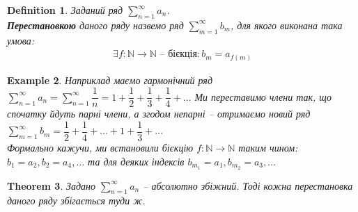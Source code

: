 \documentclass[a4paper, 10pt]{article}
\theoremstyle{theoremdd}
\newtheorem{theorem}{Theorem}[subsection]
\theoremstyle{theoremdd}
\theoremstyle{theoremdd}
\newtheorem{definition}[theorem]{Definition}
\theoremstyle{theoremdd}
\theoremstyle{theoremdd}
\newtheorem{example}[theorem]{Example}
\theoremstyle{theoremdd}
\theoremstyle{theoremdd}
\theoremstyle{theoremdd}
\theoremstyle{theoremdd}
\begin{document}
\begin{definition}
Заданий ряд $\displaystyle\sum_{n=1}^\infty a_n$.\\
\textbf{Перестановкою} даного ряду назвемо ряд $\displaystyle\sum_{m=1}^\infty b_m$, для якого виконана така умова:
\begin{align*}
\exists f \colon \mathbb{N} \to \mathbb{N} \text{ -- бієкція}: b_m = a_{f(m)}
\end{align*}
\end{definition}

\begin{example}
Наприклад маємо гармонічний ряд $\displaystyle \sum_{n=1}^\infty a_n = \sum_{n=1}^\infty \dfrac{1}{n} = 1 + \dfrac{1}{2} + \dfrac{1}{3} + \dfrac{1}{4} + \dots$ Ми переставимо члени так, що спочатку йдуть парні члени, а згодом непарні -- отримаємо новий ряд $\displaystyle\sum_{m=1}^\infty b_m = \dfrac{1}{2} + \dfrac{1}{4} + \dots + 1 + \dfrac{1}{3} + \dots$\\
Формально кажучи, ми встановили бієкцію $f \colon \mathbb{N} \to \mathbb{N}$ таким чином: $b_{1} = a_{2}, b_{2} = a_4,\dots$ та для деяких індексів $b_{m_1} = a_1, b_{m_2} = a_3, \dots$
\end{example}

\begin{theorem}
Задано $\displaystyle \sum_{n=1}^\infty a_n$ -- абсолютно збіжний. Тоді кожна перестановка даного ряду збігається туди ж.
\end{theorem}
\end{document}
